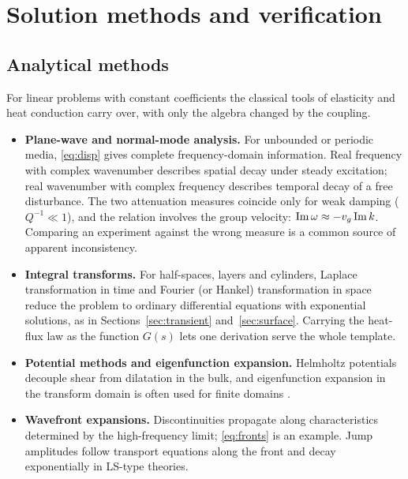 \section{Solution methods and verification}\label{sec:methods}
\subsection{Analytical methods}
For linear problems with constant coefficients the classical tools of elasticity and heat conduction carry over, with only the algebra changed by the coupling.
\begin{itemize}
\item \textbf{Plane-wave and normal-mode analysis.} For unbounded or periodic media, \eqref{eq:disp} gives complete frequency-domain information. Real frequency with complex wavenumber describes spatial decay under steady excitation; real wavenumber with complex frequency describes temporal decay of a free disturbance. The two attenuation measures coincide only for weak damping ($Q^{-1}\ll1$), and the relation involves the group velocity: $\operatorname{Im}\omega\approx-v_g\operatorname{Im} k$. Comparing an experiment against the wrong measure is a common source of apparent inconsistency.
\item \textbf{Integral transforms.} For half-spaces, layers and cylinders, Laplace transformation in time and Fourier (or Hankel) transformation in space reduce the problem to ordinary differential equations with exponential solutions, as in Sections~\ref{sec:transient} and~\ref{sec:surface}. Carrying the heat-flux law as the function $G(s)$ lets one derivation serve the whole template.
\item \textbf{Potential methods and eigenfunction expansion.} Helmholtz potentials decouple shear from dilatation in the bulk, and eigenfunction expansion in the transform domain is often used for finite domains \citep{Singh2020a}.
\item \textbf{Wavefront expansions.} Discontinuities propagate along characteristics determined by the high-frequency limit; \eqref{eq:fronts} is an example. Jump amplitudes follow transport equations along the front and decay exponentially in LS-type theories.
\end{itemize}


